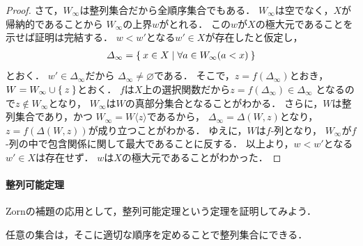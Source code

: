 \begin{proof}
    さて，$W_{\infty}$は整列集合だから全順序集合でもある．
    $W_{\infty}$は空でなく，$X$が帰納的であることから
    $W_{\infty}$の上界$w$がとれる．
    この$w$が$X$の極大元であることを示せば証明は完結する．
    $w <w'$となる$w' \in X$が存在したと仮定し，
    \begin{align*}
      \varDelta_{\infty} = \Set{ x \in X \mid \forall a \in W_{\infty} ( a<x ) }
    \end{align*}
    とおく．
    $w ' \in \varDelta_{\infty} $だから
    $\varDelta_{\infty} \neq \varnothing$である．
    そこで，$z = f( \varDelta_{\infty} )$とおき，
    $W= W_{\infty} \cup \Set{ z } $とおく．
    $f$は$X$上の選択関数だから$z= f ( \varDelta_{\infty} ) \in \varDelta_{\infty}$
    となるので$z \notin W_{\infty}$となり，
    $W_{\infty}$は$W$の真部分集合となることがわかる．
    さらに，$W$は整列集合であり，かつ
    $W_{\infty} = W \langle z \rangle$であるから，
    $\varDelta_{\infty} = \varDelta ( W, z )$となり，
    $z= f ( \varDelta (W , z ))$が成り立つことがわかる． 
    ゆえに，$W$は$f$-列となり，
    $W_{\infty}$が$f$-列の中で包含関係に関して最大であることに反する．
    以上より，$w< w'$となる$w' \in X$は存在せず．
    $w$は$X$の極大元であることがわかった．
  \end{proof}

 \paragraph{整列可能定理}
   Zornの補題の応用として，整列可能定理という定理を証明してみよう．
   \begin{thm}[整列可能定理] \label{thm:seiretukanou}
     任意の集合は，そこに適切な順序を定めることで整列集合にできる．
   \end{thm}
   

